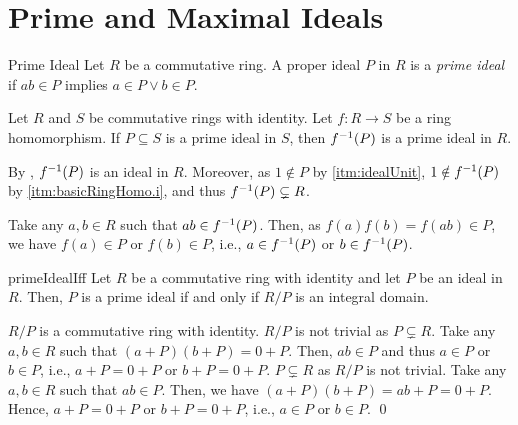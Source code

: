 \documentclass[../modern_algebra.tex]{subfiles}
\begin{document}
\section{Prime and Maximal Ideals}

\begin{Definition}[colbacktitle=red!75!black]{Prime Ideal}{}
    Let \(R\) be a commutative ring.
    A proper ideal \(P\) in \(R\) is a \textit{prime ideal}
    if \(ab \in P\) implies \(a \in P \lor b \in P\).
\end{Definition}

\begin{Theorem}{\textsf{}}{}
    Let \(R\) and \(S\) be commutative rings with identity.
    Let \(f \colon R \to S\) be a ring homomorphism.
    If \(P \subseteq S\) is a prime ideal in \(S\), then \(f^{-1}(P)\) is a prime ideal in \(R\).
\end{Theorem}
\begin{myproof}[Proof]
    By , \(f^{-1}(P)\) is an ideal in \(R\).
    Moreover, as \(1 \notin P\) by \ref{itm:idealUnit}, \(1 \notin f^{-1}(P)\)
    by \ref{itm:basicRingHomo.i}, and thus \(f^{-1}(P) \subsetneq R\).

    Take any \(a, b \in R\) such that \(ab \in f^{-1}(P)\).
    Then, as \(f(a)f(b) = f(ab) \in P\), we have
    \(f(a) \in P\) or \(f(b) \in P\), i.e., \(a \in f^{-1}(P)\) or \(b \in f^{-1}(P)\).
\end{myproof}

\begin{Theorem}{\textsf{}}{primeIdealIff}
    Let \(R\) be a commutative ring with identity and let \(P\) be an ideal in \(R\).
    Then, \(P\) is a prime ideal if and only if \(R/P\) is an integral domain.
\end{Theorem}
\begin{myclaim}[Proof]\hfill
\begin{itemize}[nolistsep, wide=0pt, widest={(\(\Rightarrow\))}, leftmargin=*, listparindent=\parindent]
    \ii[(\(\Rightarrow\))]
    \(R/P\) is a commutative ring with identity. \(R/P\) is not trivial as \(P \subsetneq R\).
    Take any \(a, b \in R\) such that \((a + P)(b + P) = 0 + P\).
    Then, \(ab \in P\) and thus \(a \in P\) or \(b \in P\), i.e., \(a + P = 0 + P\) or \(b + P = 0 + P\).
    \ii[(\(\Leftarrow\))]
    \(P \subsetneq R\) as \(R/P\) is not trivial.
    Take any \(a, b \in R\) such that \(ab \in P\).
    Then, we have \((a + P)(b + P) = ab + P = 0 + P\).
    Hence, \(a + P = 0 + P\) or \(b + P = 0 + P\), i.e., \(a \in P\) or \(b \in P\).
    \qed
\end{itemize}
\end{myclaim}
\end{document}
